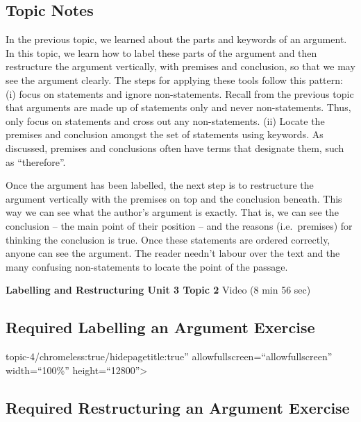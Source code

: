 \documentclass[
]{book}
\begin{document}
\hypertarget{topic-notes-9}{%
\subsection*{Topic Notes}\label{topic-notes-9}}

In the previous topic, we learned about the parts and keywords of an argument. In this topic, we learn how to label these parts of the argument and then restructure the argument vertically, with premises and conclusion, so that we may see the argument clearly. The steps for applying these tools follow this pattern: (i) focus on statements and ignore non-statements. Recall from the previous topic that arguments are made up of statements only and never non-statements. Thus, only focus on statements and cross out any non-statements. (ii) Locate the premises and conclusion amongst the set of statements using keywords. As discussed, premises and conclusions often have terms that designate them, such as ``therefore''.

Once the argument has been labelled, the next step is to restructure the argument vertically with the premises on top and the conclusion beneath. This way we can see what the author's argument is exactly. That is, we can see the conclusion -- the main point of their position -- and the reasons (i.e.~premises) for thinking the conclusion is true. Once these statements are ordered correctly, anyone can see the argument. The reader needn't labour over the text and the many confusing non-statements to locate the point of the passage.

\textbf{Labelling and Restructuring Unit 3 Topic 2} Video (8 min 56 sec)

\hypertarget{required-labelling-an-argument-exercise}{%
\subsection*{Required Labelling an Argument Exercise}\label{required-labelling-an-argument-exercise}}

\begin{reflect}
topic-4/chromeless:true/hidepagetitle:true'' allowfullscreen=``allowfullscreen'' width=``100\%'' height=``12800''\textgreater{}
\end{reflect}

\hypertarget{required-restructuring-an-argument-exercise}{%
\subsection*{Required Restructuring an Argument Exercise}\label{required-restructuring-an-argument-exercise}}
\end{document}
